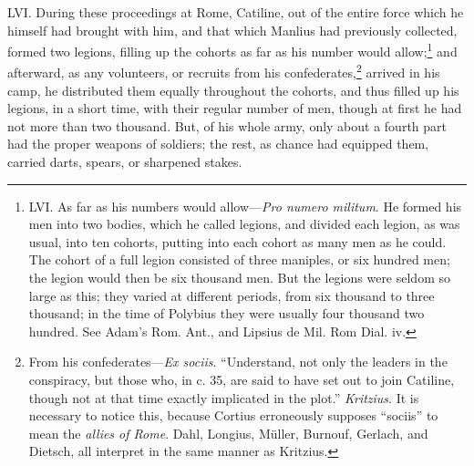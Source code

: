 LVI. During these proceedings at Rome, Catiline, out of the entire
force which he himself had brought with him, and that which Manlius
had previously collected, formed two legions, filling up the cohorts
as far as his number would allow;\footnote{LVI. As far as his numbers would allow—\emph{Pro numero militum}.
He formed his men into two bodies, which he called legions, and
divided each legion, as was usual, into ten cohorts, putting into
each cohort as many men as he could. The cohort of a full legion
consisted of three maniples, or six hundred men; the legion would then
be six thousand men. But the legions were seldom so large as this;
they varied at different periods, from six thousand to three thousand;
in the time of Polybius they were usually four thousand two hundred.
See Adam's Rom. Ant., and Lipsius de Mil. Rom Dial. iv.} and afterward, as any
volunteers, or recruits from his confederates,\footnote{From his confederates—\emph{Ex sociis}. ``Understand, not only
the leaders in the conspiracy, but those who, in c. 35, are said to
have set out to join Catiline, though not at that time exactly
implicated in the plot.'' \emph{Kritzius}. It is necessary to notice this,
because Cortius erroneously supposes ``sociis'' to mean the \emph{allies of
Rome}. Dahl, Longius, Müller, Burnouf, Gerlach, and Dietsch, all
interpret in the same manner as Kritzius.} arrived in his
camp, he distributed them equally throughout the cohorts, and thus
filled up his legions, in a short time, with their regular number of
men, though at first he had not more than two thousand. But, of his
whole army, only about a fourth part had the proper weapons of
soldiers; the rest, as chance had equipped them, carried darts,
spears, or sharpened stakes.

